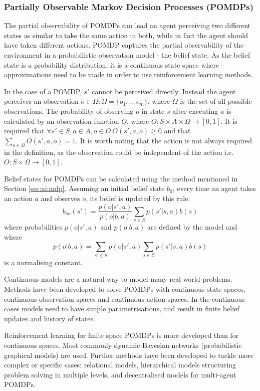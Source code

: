 \subsubsection{Partially Observable Markov Decision Processes (POMDPs)}
\label{sec:ai:pomdp}

The partial observability of POMDPs can lead an agent perceiving two different
states as similar to take the same action in both, while in fact the agent
should have taken different actions. POMDP captures the partial observability
of the environment in a probabilistic observation model - the belief state. As
the belief state is a probability distribution, it is a continuous state space
where approximations need to be made in order to use reinforcement learning
methods. \parencite{Russell2010ai+modern}

In the case of a POMDP, \(s'\) cannot be perceived directly. Instead the agent
perceives an observation \(o \in \Omega : \Omega = \{o_1,..,o_m\}\), where
\(\Omega\) is the set of all possible observations. The probability of
observing \(o\) in state \(s\) after executing \(a\) is calculated by an
observation function \(O\), where \(O : S \times A \times \Omega \rightarrow
[0,1] \). It is required that \(\forall s' \in S, a \in A, o \in O ~ O (s', a,
o) \geq 0 \) and that \(\sum_{o \in \Omega}^{} O (s', a, o) = 1 \). It is worth
noting that the action is not always required in the definition, as the
observation could be independent of the action i.e. \(O : S \times \Omega
\rightarrow [0,1] \). \parencite{Spaan2012ai+pomdp}

Belief states for POMDPs can be calculated using the method mentioned in
Section \ref{sec:ai:mdp}. Assuming an initial belief state \(b_0\), every time
an agent takes an action \(a\) and observes \(o\), its belief is updated by
this rule: \[ b_{ao}(s') = \frac{ p(o|s',a) }{ p(o|b,a) } \sum_{s \in S}
p(s'|s,a) b(s) \] where probabilities \(p(o|s',a)\) and \(p(o|b,a)\) are
defined by the model and where \[p(o|b,a) = \sum_{s' \in S} p(o|s',a) \sum_{s
\in S} p(s'|s,a) b(s) \] is a normalising constant.
\parencite{Spaan2012ai+pomdp}

Continuous models are a natural way to model many real world problems. Methods
have been developed to solve POMDPs with continuous state spaces, continuous
observation spaces and continuous action spaces. In the continuous cases models
need to have simple parametrisations, and result in finite belief updates and
history of states. \parencite{Spaan2012ai+pomdp}

Reinforcement learning for finite space POMDPs is more developed than for
continuous spaces. Most commonly dynamic Bayesian networks (probabilistic
graphical models) are used. Further methods have been developed to tackle more
complex or specific cases: relational models, hierarchical models structuring
problem solving in multiple levels, and decentralised models for multi-agent
POMDPs. \parencite{Spaan2012ai+pomdp}

